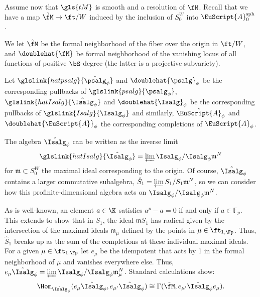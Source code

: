 Assume now that $\gls{tM}$ is smooth and a resolution of $\fM$. Recall that we have a map $\tilde{\fM}\to \ft/W$ induced by the inclusion of $S_0^W$ into
$\EuScript{A}_0^{\operatorname{sph}}$.
\begin{definition}
  We let $\hat{\fM}$ be the formal neighborhood of the fiber over the origin in $\ft/W$, and $\doublehat{\fM}$ be formal neighborhood of the vanishing locus of all functions of positive $\bS$-degree (the latter is a projective subvariety).

 Let $\glslink{hatpsalg}{\hat{\psalg}_\phi}$ and $\doublehat{\psalg}_\phi$ be the corresponding pullbacks of $ \glslink{psalg}{\psalg_\phi}$, $\glslink{hatIsalg}{\hat{\Isalg}_\phi}$ and $\doublehat{\Isalg}_\phi$ be the corresponding pullbacks of $ \glslink{Isalg}{\Isalg_\phi}$ and similarly, $\hat{\EuScript{A}}_\phi$ and $\doublehat{\EuScript{A}}_\phi$ the corresponding completions of $ \EuScript{A}_{\phi}$.
\end{definition}




The algebra $\hat{\Isalg}_\phi$ can be written as the inverse limit
\[\glslink{hatIsalg}{\hat{\Isalg}_\phi}=\varprojlim {\Isalg}_\phi/{\Isalg}_\phi\mathfrak{m}^N\] for
$\mathfrak{m}\subset S_0^W$ the maximal ideal corresponding to the
origin.  Of course, $\hat{\Isalg}_\phi$ contains a larger commutative
subalgebra, $\hat{S}_1=\varprojlim {S}_1/{S}_1\mathfrak{m}^N$, so we can consider how this profinite-dimensional algebra acts on
${\Isalg}_\phi/{\Isalg}_\phi\mathfrak{m}^N$.

As is well-known, an element $a\in \K$ satisfies $a^p-a=0$ if and only if $a\in \mathbb{F}_p$.
This extends to show that in 
$S_1$, the ideal $\mathfrak{m}S_1$ has radical given by the intersection of the maximal ideals $\mathfrak{m}_{\mu}$ defined by the points in $\mu \in \ft_{1,\Fp}$.  Thus, $\hat{S}_1$ breaks up as the sum of the completions at these individual maximal ideals.  For a given $\mu\in \ft_{1,\Fp}$ let $e_{\mu}$ be the idempotent that acts by 1 in the formal neighborhood of $\mu$ and vanishes everywhere else.  Thus, $e_{\mu}\hat{\Isalg}_\phi =\varprojlim \Isalg_\phi/  \Isalg_\phi \mathfrak{m}_{\mu}^N$.  Standard calculations show:
\begin{equation}\label{eq:summand-hom}
  \Hom_{\hat{\Isalg}_\phi}(e_{\mu}\hat{\Isalg}_\phi, e_{\mu'}\hat{\Isalg}_\phi)\cong \Gamma(\tilde{\fM}, e_{\mu'}\hat{\Isalg}_\phi e_{\mu}).  
\end{equation}

